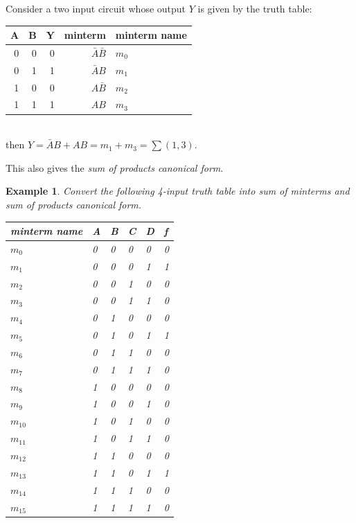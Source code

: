 \documentclass{article}
\newtheorem{example}{Example}
\begin{document}
\noindent Consider a two input circuit whose output $Y$ is given by the truth table:\\
\begin{tabular}{rrrrp{20mm}}
  \toprule
  A & B &  Y & minterm & minterm name\\
  \midrule
  0 & 0 & 0 & $\bar{A} \bar{B}$ & $m_0$ \\
  0 & 1 & 1 & $\bar{A}      B $ & $m_1$ \\
  1 & 0 & 0 & $     A  \bar{B}$ & $m_2$ \\
  1 & 1 & 1 & $     A       B $ & $m_3$ \\
  \bottomrule
\end{tabular}\\[1em]
then $Y = \bar{A}      B  + A B = m_1 + m_3 = \sum (1, 3)$.

\noindent This also gives the \emph{sum of products canonical form}.

\begin{example}
  Convert the following 4-input truth table into sum of minterms and sum of products canonical form.

  \noindent \begin{tabular}{p{20mm}llll|l}
    \toprule
    minterm name & A & B & C & D & f \\
    \midrule
    $m_0$ & 0 & 0 & 0 & 0 & 0 \\ 
    $m_1$ & 0 & 0 & 0 & 1 & 1 \\ 
    $m_2$ & 0 & 0 & 1 & 0 & 0 \\ 
    $m_3$ & 0 & 0 & 1 & 1 & 0 \\ 
    $m_4$ & 0 & 1 & 0 & 0 & 0 \\ 
    $m_5$ & 0 & 1 & 0 & 1 & 1 \\ 
    $m_6$ & 0 & 1 & 1 & 0 & 0 \\ 
    $m_7$ & 0 & 1 & 1 & 1 & 0 \\ 
    $m_8$ & 1 & 0 & 0 & 0 & 0 \\ 
    $m_9$ & 1 & 0 & 0 & 1 & 0 \\ 
    $m_{10}$ & 1 & 0 & 1 & 0 & 0 \\
    $m_{11}$ & 1 & 0 & 1 & 1 & 0 \\
    $m_{12}$ & 1 & 1 & 0 & 0 & 0 \\
    $m_{13}$ & 1 & 1 & 0 & 1 & 1 \\
    $m_{14}$ & 1 & 1 & 1 & 0 & 0 \\
    $m_{15}$ & 1 & 1 & 1 & 1 & 0 \\
    \bottomrule
  \end{tabular}
\end{example}
\end{document}
